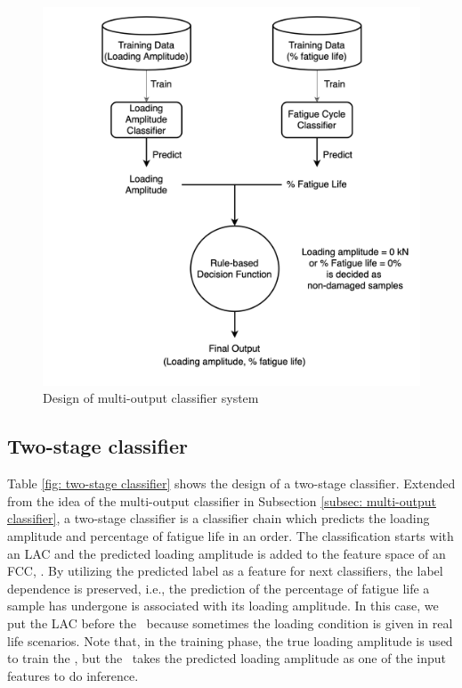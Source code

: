 \begin{figure}[tb]
    \centering
    \includegraphics[width=0.9\linewidth]{fig/multi-ouput_classifier.png}
    \caption{Design of multi-output classifier system}
    \label{fig: multi-output classifier}
\end{figure}

\subsection{Two-stage classifier}
Table \ref{fig: two-stage classifier} shows the design of a two-stage classifier. Extended from the idea of the multi-output classifier in Subsection \ref{subsec: multi-output classifier}, a two-stage classifier is a classifier chain which predicts the loading amplitude and percentage of fatigue life in an order. The classification starts with an LAC and the predicted loading amplitude is added to the feature space of an FCC, \fcctwo. By utilizing the predicted label as a feature for next classifiers, the label dependence is preserved, i.e., the prediction of the percentage of fatigue life a sample has undergone is associated with its loading amplitude. In this case, we put the LAC before the \fcctwo \  because sometimes the loading condition is given in real life scenarios. Note that, in the training phase, the true loading amplitude is used to train the \fcctwo, but the \fcctwo \ takes the predicted loading amplitude as one of the input features to do inference.

